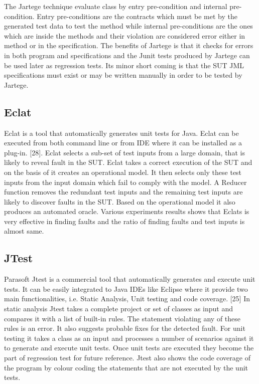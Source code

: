 \noindent The Jartege technique evaluate class by entry pre-condition and internal pre-condition. Entry pre-conditions are the contracts which must be met by the generated test data to test the method while internal pre-conditions are the ones which are inside the methods and their violation are considered error either in method or in the specification. The benefits of Jartege is that it checks for errors in both program and specifications and the Junit tests produced by Jartege can be used later as regression tests. Its minor short coming is that the SUT JML specifications must exist or may be written manually in order to be tested by Jartege.

\subsection{Eclat}
Eclat \cite{Pacheco2005} is a tool that automatically generates unit tests for Java. Eclat can be executed from both command line or from IDE where it can be installed as a plug-in. [28]. Eclat selects a sub-set of test inputs from a large domain, that is likely to reveal fault in the SUT. Eclat takes a correct execution of the SUT and on the basis of it creates an operational model. It then selects only these test inputs from the input domain which fail to comply with the model. A Reducer function removes the redundant test inputs and the remaining test inputs are likely to discover faults in the SUT. Based on the operational model it also produces an automated oracle. Various experiments results shows that Eclats is very effective in finding faults and the ratio of finding faults and test inputs is almost same.

\subsection{JTest}
Parasoft Jtest is a commercial tool that automatically generates and execute unit tests. It can be easily integrated to Java IDEs like Eclipse where it provide two main functionalities, i.e. Static Analysis, Unit testing and code coverage. [25]
In static analysis Jtest takes a complete project or set of classes as input and compares it with a list of built-in rules. The statement violating any of these rules is an error. It also suggests probable fixes for the detected fault.
For unit testing it takes a class as an input and processes a number of scenarios against it to generate and execute unit tests. Once unit tests are executed they become the part of regression test for future reference.
Jtest also shows the code coverage of the program by colour coding the statements that are not executed by the unit tests.


